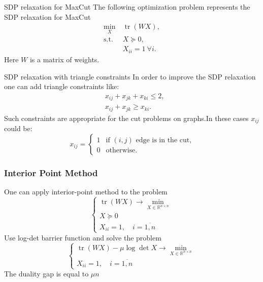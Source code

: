 \documentclass[10pt]{beamer}
\DeclareMathOperator{\tr}{tr}
\begin{document}
	\begin{frame}{SDP relaxation for MaxCut}
	    The following optimization problem represents the SDP relaxation for MaxCut
	    \begin{align*}
	        \min_X &~ \tr(WX),\\
	        \text{s.t.} &~ X \succeq 0,\\
	        &~ X_{ii} = 1 ~\forall i.
	    \end{align*}
	    Here $W$ is a matrix of weights.
	    
	    
	\end{frame}
        
        \begin{frame}{SDP relaxation with triangle constraints}
            In order to improve the SDP relaxation one can add triangle constraints like:
            \begin{align*}
                &x_{ij} + x_{jk} + x_{ki} \leq 2, \\
                &x_{ij} + x_{jk} \geq x_{ki}.
            \end{align*}
            Such constraints are appropriate for the cut problems on graphs.In these cases $x_{ij}$ could be:
            \[
                x_{ij} = \begin{cases} 1 & \text{if } (i, j) \text{ edge is in the cut,} \\ 
                0 & \text{otherwise.}\end{cases}
            \]
            
        \end{frame}

	\begin{frame}
		\frametitle{Interior Point Method}
		
		One can apply interior-point method to the problem
		\[
			\begin{cases}
				\tr(WX) \rightarrow \min\limits_{X \in \mathbb R^{n \times n}} \\
				X \succeq 0 \\
				X_{ii} = 1, \quad i = \overline{1, n}
			\end{cases}
		\]
		Use log-det barrier function and solve the problem
		\[
			\begin{cases}
				\tr(WX) - \mu \log\det X \rightarrow \min\limits_{X \in \mathbb R^{n 
				\times n}} \\
				X_{ii} = 1, \quad i = \overline{1, n}
			\end{cases}
		\]
		The duality gap is equal to $\mu n$
	\end{frame}
	
\end{document}
